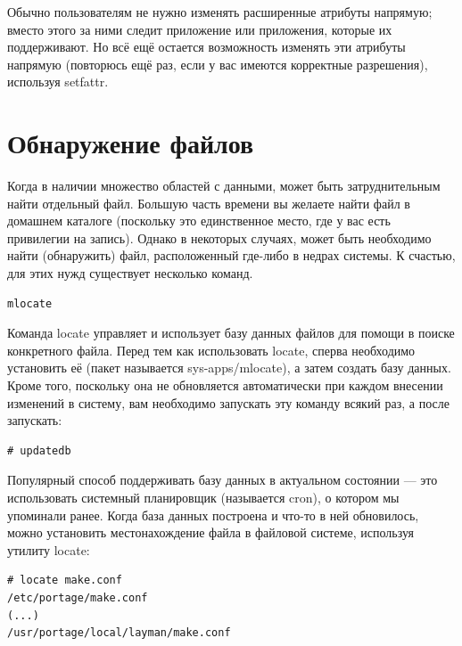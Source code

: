 \documentclass[10pt]{book}
\begin{document}
Обычно пользователям не нужно изменять расширенные атрибуты напрямую; вместо этого за ними следит приложение или приложения, которые их поддерживают. Но всё ещё остается возможность изменять эти атрибуты напрямую (повторюсь ещё раз, если у вас имеются корректные разрешения), используя setfattr.

\section {Обнаружение файлов}

Когда в наличии множество областей с данными, может быть затруднительным найти отдельный файл. Большую часть времени вы желаете найти файл в домашнем каталоге (поскольку это единственное место, где у вас есть привилегии на запись). Однако в некоторых случаях, может быть необходимо найти (обнаружить) файл, расположенный где-либо в недрах системы.
К счастью, для этих нужд существует несколько команд.

\vspace{3mm}
\begin{tcolorbox}
\begin{lstlisting}
mlocate 
\end{lstlisting}
\end{tcolorbox}

Команда locate управляет и использует базу данных файлов для помощи в поиске конкретного файла. Перед тем как использовать locate, сперва необходимо установить её (пакет называется sys-apps/mlocate), а затем создать базу данных. Кроме того, поскольку она не обновляется автоматически при каждом внесении изменений в систему, вам необходимо запускать эту команду всякий раз, а после запускать:

\vspace{3mm}
\begin{tcolorbox}
\begin{lstlisting}
# updatedb
\end{lstlisting}
\end{tcolorbox}

Популярный способ поддерживать базу данных в актуальном состоянии — это использовать системный планировщик (называется cron), о котором мы упоминали ранее.
Когда база данных построена и что-то в ней обновилось, можно установить местонахождение файла в файловой системе, используя утилиту locate:

\vspace{3mm}
\begin{tcolorbox}
\begin{lstlisting}
# locate make.conf
/etc/portage/make.conf
(...)
/usr/portage/local/layman/make.conf
\end{lstlisting}
\end{tcolorbox}
\end{document}
